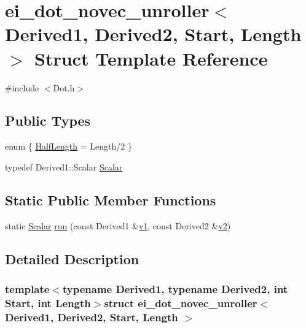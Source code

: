 \hypertarget{structei__dot__novec__unroller}{\section{ei\-\_\-dot\-\_\-novec\-\_\-unroller$<$ Derived1, Derived2, Start, Length $>$ Struct Template Reference}
\label{structei__dot__novec__unroller}
}


{\ttfamily \#include $<$Dot.\-h$>$}

\subsection*{Public Types}
\begin{DoxyCompactItemize}
\item 
enum \{ \hyperlink{structei__dot__novec__unroller_a64d152ec95cf1a8b02aaaa1268bfeeddac378a795cc02381a251bcf6a811d4afe}{Half\-Length} = Length/2
 \}
\item 
typedef Derived1\-::\-Scalar \hyperlink{structei__dot__novec__unroller_a65460ac5d9069e7849e735000eacba50}{Scalar}
\end{DoxyCompactItemize}
\subsection*{Static Public Member Functions}
\begin{DoxyCompactItemize}
\item 
static \hyperlink{structei__dot__novec__unroller_a65460ac5d9069e7849e735000eacba50}{Scalar} \hyperlink{structei__dot__novec__unroller_a432a6d9081c93003568240e0a2d9e5e6}{run} (const Derived1 \&\hyperlink{glext_8h_aabdd9aabede45fcf97cea04f88d2ad60}{v1}, const Derived2 \&\hyperlink{glext_8h_ae35401c8c2fcdcc48c20ba325ee473ea}{v2})
\end{DoxyCompactItemize}


\subsection{Detailed Description}
\subsubsection*{template$<$typename Derived1, typename Derived2, int Start, int Length$>$struct ei\-\_\-dot\-\_\-novec\-\_\-unroller$<$ Derived1, Derived2, Start, Length $>$}



